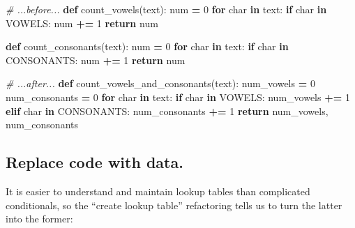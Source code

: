 \documentclass[
]{krantz}
\makeatletter
\newenvironment{Shaded}{\begin{snugshade}}{\end{snugshade}}
\newcommand{\CommentTok}[1]{\textcolor[rgb]{0.56,0.35,0.01}{\textit{#1}}}
\newcommand{\ControlFlowTok}[1]{\textcolor[rgb]{0.13,0.29,0.53}{\textbf{#1}}}
\newcommand{\DecValTok}[1]{\textcolor[rgb]{0.00,0.00,0.81}{#1}}
\newcommand{\KeywordTok}[1]{\textcolor[rgb]{0.13,0.29,0.53}{\textbf{#1}}}
\newcommand{\NormalTok}[1]{#1}
\newcommand{\OperatorTok}[1]{\textcolor[rgb]{0.81,0.36,0.00}{\textbf{#1}}}
\newenvironment{kframe}{%
\medskip{}
\setlength{\fboxsep}{.8em}
 \def\at@end@of@kframe{}%
 \ifinner\ifhmode%
  \def\at@end@of@kframe{\end{minipage}}%
  \begin{minipage}{\columnwidth}%
 \fi\fi%
 \def\FrameCommand##1{\hskip\@totalleftmargin \hskip-\fboxsep
 \colorbox{shadecolor}{##1}\hskip-\fboxsep
     \hskip-\linewidth \hskip-\@totalleftmargin \hskip\columnwidth}%
 \MakeFramed {\advance\hsize-\width
   \@totalleftmargin\z@ \linewidth\hsize
   \@setminipage}}%
 {\par\unskip\endMakeFramed%
 \at@end@of@kframe}
\renewenvironment{Shaded}{\begin{kframe}}{\end{kframe}}
\makeatother
\begin{document}
\begin{Shaded}
\begin{Highlighting}[]
\CommentTok{\# ...before...}
\KeywordTok{def}\NormalTok{ count\_vowels(text):}
\NormalTok{    num }\OperatorTok{=} \DecValTok{0}
    \ControlFlowTok{for}\NormalTok{ char }\KeywordTok{in}\NormalTok{ text:}
        \ControlFlowTok{if}\NormalTok{ char }\KeywordTok{in}\NormalTok{ VOWELS:}
\NormalTok{            num }\OperatorTok{+=} \DecValTok{1}
    \ControlFlowTok{return}\NormalTok{ num}

\KeywordTok{def}\NormalTok{ count\_consonants(text):}
\NormalTok{    num }\OperatorTok{=} \DecValTok{0}
    \ControlFlowTok{for}\NormalTok{ char }\KeywordTok{in}\NormalTok{ text:}
        \ControlFlowTok{if}\NormalTok{ char }\KeywordTok{in}\NormalTok{ CONSONANTS:}
\NormalTok{            num }\OperatorTok{+=} \DecValTok{1}
    \ControlFlowTok{return}\NormalTok{ num}
\end{Highlighting}
\end{Shaded}

\begin{Shaded}
\begin{Highlighting}[]
\CommentTok{\# ...after...}
\KeywordTok{def}\NormalTok{ count\_vowels\_and\_consonants(text):}
\NormalTok{    num\_vowels }\OperatorTok{=} \DecValTok{0}
\NormalTok{    num\_consonants }\OperatorTok{=} \DecValTok{0}
    \ControlFlowTok{for}\NormalTok{ char }\KeywordTok{in}\NormalTok{ text:}
        \ControlFlowTok{if}\NormalTok{ char }\KeywordTok{in}\NormalTok{ VOWELS:}
\NormalTok{            num\_vowels }\OperatorTok{+=} \DecValTok{1}
        \ControlFlowTok{elif}\NormalTok{ char }\KeywordTok{in}\NormalTok{ CONSONANTS:}
\NormalTok{            num\_consonants }\OperatorTok{+=} \DecValTok{1}
    \ControlFlowTok{return}\NormalTok{ num\_vowels, num\_consonants}
\end{Highlighting}
\end{Shaded}

\hypertarget{replace-code-with-data.}{%
\subsection{Replace code with data.}\label{replace-code-with-data.}}

It is easier to understand and maintain lookup tables than complicated conditionals,
so the ``create lookup table'' refactoring tells us to turn the latter into the former:
\end{document}
